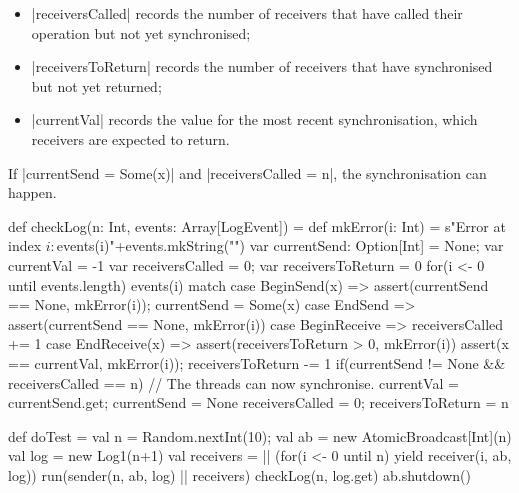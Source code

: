 \begin{answerS}
\begin{itemize}
\item |receiversCalled| records the number of receivers that have called their
  operation but not yet synchronised;

\item |receiversToReturn| records the number of receivers that have
  synchronised but not yet returned;

\item |currentVal| records the value for the most recent synchronisation,
  which receivers are expected to return.
\end{itemize}
%
If |currentSend = Some(x)| and |receiversCalled = n|, the synchronisation can
happen.  
%
\begin{scala}
  def checkLog(n: Int, events: Array[LogEvent]) = {
    def mkError(i: Int) = 
      s"Error at index $i: ${events(i)}\n"+events.mkString("\n")
    var currentSend: Option[Int] = None; var currentVal = -1
    var receiversCalled = 0; var receiversToReturn = 0
    for(i <- 0 until events.length){
      events(i) match{
        case BeginSend(x) => 
          assert(currentSend == None, mkError(i)); currentSend = Some(x)
        case EndSend => assert(currentSend == None, mkError(i))
        case BeginReceive => receiversCalled += 1
        case EndReceive(x) => 
          assert(receiversToReturn > 0, mkError(i))
          assert(x == currentVal, mkError(i)); receiversToReturn -= 1
      }
      if(currentSend != None && receiversCalled == n){
        // The threads can now synchronise.
        currentVal = currentSend.get; currentSend = None
        receiversCalled = 0; receiversToReturn = n
      }
    }
  }

  def doTest = {
    val n = Random.nextInt(10); val ab = new AtomicBroadcast[Int](n)
    val log = new Log1(n+1)
    val receivers = || (for(i <- 0 until n) yield receiver(i, ab, log))
    run(sender(n, ab, log) || receivers)
    checkLog(n, log.get)
    ab.shutdown()
  }
\end{scala}
\end{answerS}
